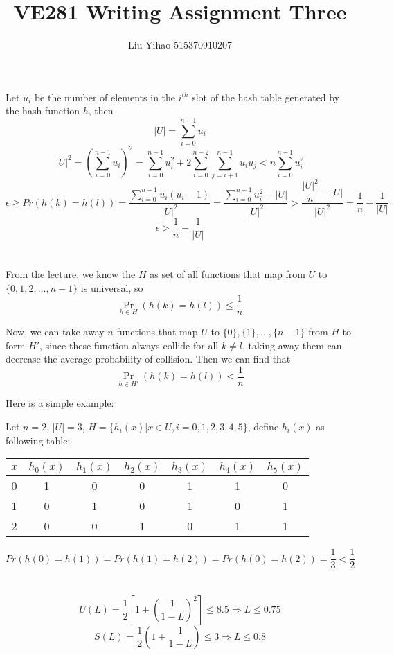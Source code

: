 \documentclass{article}
\title{VE281 Writing Assignment Three}
\author{Liu Yihao 515370910207}
\date{}
\begin{document}
\maketitle

\section{}
Let $u_i$ be the number of elements in the $i^{th}$ slot of the hash table generated by the hash function $h$, then 
$$|U|=\sum\limits_{i=0}^{n-1}u_i$$
$$|U|^2=\left(\sum\limits_{i=0}^{n-1}u_i\right)^2=\sum\limits_{i=0}^{n-1}u_i^2+2\sum_{i=0}^{n-2}\sum_{j=i+1}^{n-1}u_iu_j< n\sum\limits_{i=0}^{n-1}u_i^2$$
$$\epsilon\geqslant Pr(h(k)=h(l))=\frac{\sum\limits_{i=0}^{n-1}u_i(u_i-1)}{|U|^2}=\frac{\sum\limits_{i=0}^{n-1}u_i^2-|U|}{|U|^2}>\frac{\dfrac{|U|^2}{n}-|U|}{|U|^2}=\frac{1}{n}-\frac{1}{|U|}$$
$$\epsilon>\frac{1}{n}-\frac{1}{|U|}$$

\section{}
From the lecture, we know the $H$ as set of all functions that map from $U$ to $\{0,1,2,\dots,n-1\}$ is universal, so $$\mathop{Pr}\limits_{h\in H}(h(k)=h(l))\leqslant\frac{1}{n}$$

Now, we can take away $n$ functions that map $U$ to $\{0\},\{1\},\dots,\{n-1\}$ from $H$ to form $H'$, since these function always collide for all $k\neq l$, taking away them can decrease the average probability of collision. Then we can find that $$\mathop{Pr}\limits_{h\in H'}(h(k)=h(l))<\frac{1}{n}$$

Here is a simple example:

Let $n=2$, $|U|=3$, $H=\{h_i(x)|x\in U,i=0,1,2,3,4,5\}$, define $h_i(x)$ as following table:
\begin{center}
\begin{tabular}{|c|c|c|c|c|c|c|}
\hline
$x$ & $h_0(x)$ & $h_1(x)$ & $h_2(x)$ & $h_3(x)$ & $h_4(x)$ & $h_5(x)$ \\\hline
0 & 1 & 0 & 0 & 1 & 1 & 0\\\hline
1 & 0 & 1 & 0 & 1 & 0 & 1\\\hline
2 & 0 & 0 & 1 & 0 & 1 & 1\\\hline
\end{tabular}
\end{center}
$$Pr(h(0)=h(1))=Pr(h(1)=h(2))=Pr(h(0)=h(2))=\frac{1}{3}<\frac{1}{2}$$
\section{}
$$U(L)=\frac{1}{2}\left[1+\left(\frac{1}{1-L}\right)^2\right]\leqslant8.5\Longrightarrow L\leqslant 0.75$$
$$S(L)=\frac{1}{2}\left(1+\frac{1}{1-L}\right)\leqslant3\Longrightarrow L\leqslant0.8$$
\end{document}

